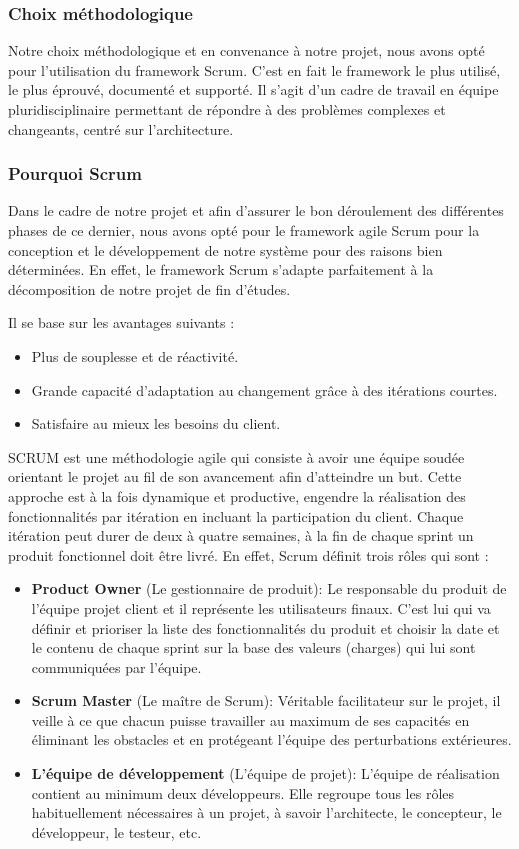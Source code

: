 \subsubsection{Choix méthodologique}
Notre choix méthodologique et en convenance à notre projet, nous avons opté pour l'utilisation du framework Scrum. C'est en fait le framework le plus utilisé, le plus éprouvé, documenté et supporté. Il s'agit d'un cadre de travail en équipe pluridisciplinaire permettant de répondre à des problèmes complexes et changeants, centré sur l'architecture.
\subsubsection{Pourquoi Scrum}
Dans le cadre de notre projet et afin d'assurer le bon déroulement des différentes phases de ce dernier, nous avons opté pour le framework agile Scrum pour la conception et le développement de notre système pour des raisons bien déterminées. En effet, le framework Scrum s'adapte parfaitement à la décomposition de notre projet de fin d'études.

Il se base sur les avantages suivants :

\begin{itemize}
  \item Plus de souplesse et de réactivité.
  \item Grande capacité d'adaptation au changement grâce à des itérations courtes.
  \item Satisfaire au mieux les besoins du client.
\end{itemize}



SCRUM est une méthodologie agile qui consiste à avoir une équipe soudée orientant le projet au fil de son avancement afin d'atteindre un but. Cette approche est à la fois dynamique et productive, engendre la réalisation des fonctionnalités par itération en incluant la participation du client. Chaque itération peut durer de deux à quatre semaines, à la fin de chaque sprint un produit fonctionnel doit être livré. En effet, Scrum définit trois rôles qui sont :

\begin{itemize}
  \item \textbf{Product Owner }(Le gestionnaire de produit):
  Le responsable du produit de l'équipe projet client et il représente les utilisateurs finaux. C'est lui qui va définir et prioriser la liste des fonctionnalités du produit et choisir la date et le contenu de chaque sprint sur la base des valeurs (charges) qui lui sont communiquées par l'équipe.
  \item \textbf{Scrum Master} (Le maître de Scrum):
  Véritable facilitateur sur le projet, il veille à ce que chacun puisse travailler au maximum de ses capacités en éliminant les obstacles et en protégeant l'équipe des perturbations extérieures.
  \item \textbf{L'équipe de développement} (L'équipe de projet):
  L'équipe de réalisation contient au minimum deux développeurs. Elle regroupe tous les rôles habituellement nécessaires à un projet, à savoir l'architecte, le concepteur, le développeur, le testeur, etc.
\end{itemize}

